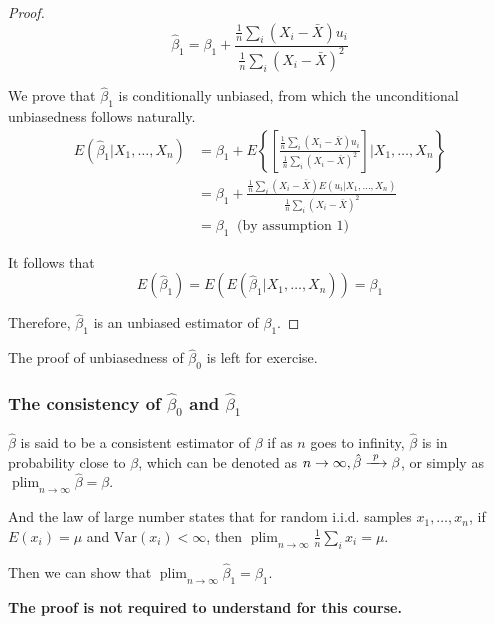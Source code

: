 \documentclass[a4paper,11pt]{article}
\newcommand{\var}{\mathrm{Var}}
\newcommand{\rarrowd}[1]{\xrightarrow{\text{ \textit #1 }}}
\DeclareMathOperator*{\plim}{plim}
\begin{document}
\begin{itemize}
\begin{proof}
\begin{equation}
\label{eq:betahat-1b}
\hat{\beta}_1 = \beta_1 + \frac{\frac{1}{n}\sum_i (X_i - \bar{X})u_i}{\frac{1}{n}\sum_i (X_i - \bar{X})^2}
\end{equation}

We prove that $\hat{\beta}_1$ is conditionally unbiased, from which
the unconditional unbiasedness follows naturally.
\begin{equation*}
\begin{split}
E(\hat{\beta}_1 | X_1, \ldots, X_n) &= \beta_1 + E\left\lbrace \left[\frac{\frac{1}{n}\sum_i (X_i - \bar{X})u_i}{\frac{1}{n}\sum_i (X_i - \bar{X})^2} \right] | X_1, \ldots, X_n \right\rbrace \\
&= \beta_1 + \frac{\frac{1}{n}\sum_i (X_i - \bar{X})E(u_i|X_1, \ldots, X_n)}{\frac{1}{n}\sum_i (X_i - \bar{X})^2} \\
&= \beta_1\: \text{ (by assumption 1)}
\end{split}
\end{equation*}

It follows that \[E(\hat{\beta}_1) = E(E(\hat{\beta}_1 | X_1, \ldots, X_n)) = \beta_1\]

Therefore, $\hat{\beta}_1$ is an unbiased estimator of $\beta_1$.
\end{proof}

The proof of unbiasedness of \(\hat{\beta}_0\) is left for exercise.
\end{itemize}

\subsubsection*{The consistency of \(\hat{\beta}_0\) and \(\hat{\beta}_1\)}
\label{sec:org0b0793f}
\(\hat{\beta}\) is said to be a consistent estimator
of \(\beta\) if as \(n\) goes to infinity, \(\hat{\beta}\) is in probability
close to \(\beta\), which can be denoted as \(n \rightarrow \infty,
\hat{\beta} \rarrowd{p} \beta\), or simply as \(\plim_{n \rightarrow
\infty} \hat{\beta} = \beta\).

And the law of large number states that for random i.i.d. samples \(x_1,
\ldots, x_n\), if \(E(x_i) = \mu\) and \(\var(x_i) < \infty\), then
\(\plim_{n \rightarrow \infty} \frac{1}{n}\sum_i x_i = \mu\).

Then we can show that \(\plim_{n \rightarrow \infty} \hat{\beta}_1 =
\beta_1\).

\textbf{The proof is not required to understand for this course.}
\end{document}
